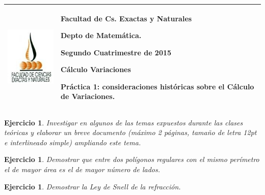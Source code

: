 \documentclass{article}
\newcounter{ejer}
\newtheorem{ejercicio}[ejer]{Ejercicio}}
\begin{document}
\setlength{\unitlength}{1cm}
%
\setlength{\extrarowheight}{5mm}
%

\noindent\begin{tabular}{m{} m{}}\hline\hline
\includegraphics[scale=.4]{imagenes/ico_exactas.jpg} &
\begin{bfseries}  \begin{scshape}
Facultad de Cs. Exactas y Naturales\par
        Depto de Matemática.\par
        Segundo Cuatrimestre de 2015\par
        Cálculo Variaciones \par
        Práctica 1: consideraciones históricas sobre el Cálculo de Variaciones.
\end{scshape}
\end{bfseries}
\\
\hline\hline
\end{tabular}
\renewcommand{\theenumi}{\alph{enumi}}





\begin{ejercicio} Investigar en algunos de las temas expuestos durante las clases teóricas y elaborar un breve documento (máximo 2 páginas, tamaño de letra 12pt e  interlineado simple) ampliando este tema.
\end{ejercicio}

\begin{ejercicio} Demostrar que entre dos polígonos regulares con el mismo perímetro el de mayor área es el de mayor número de lados.
\end{ejercicio}

\begin{ejercicio} Demostrar la Ley de Snell de la refracción.
 \end{ejercicio}
\end{document}
